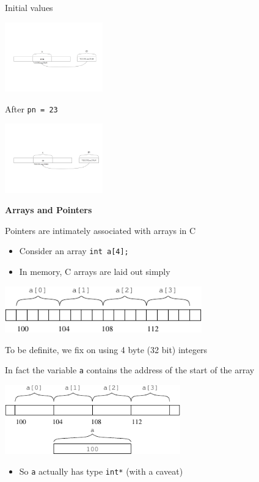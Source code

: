 \documentclass{beamer}
\def\code#1{{\ifmmode\else\large\fi\tt#1}}
\begin{document}
\begin{frame}
Initial values
\bigskip
\begin{center}
\includegraphics[height=3cm, keepaspectratio]{Pics/pointers1}
\end{center}
\end{frame}

\begin{frame}
After \code{*pn = 23}
\begin{center}
\includegraphics[height=3cm, keepaspectratio]{Pics/pointers2}
\end{center}
\end{frame}

\begin{frame}
\begin{center}
\textbf{Arrays and Pointers}
\end{center}
Pointers are intimately associated with arrays in C
\begin{itemize}
\item Consider an array \code{int a[4];}
\item In memory, C arrays are laid out simply
\end{itemize}
\begin{center}
\includegraphics[height=2cm, keepaspectratio]{Pics/ptrarray1}
\end{center}
\bigskip
To be definite, we fix on using 4 byte (32 bit) integers
\end{frame}

\begin{frame}
In fact the variable \code{a} contains the address of the start of the array
\begin{center}
\includegraphics[height=3cm, keepaspectratio]{Pics/ptrarray2}
\end{center}
\begin{itemize}
\item{So \code{a} actually has type \code{int*} (with a caveat)}
\end{itemize}
\end{frame}
\end{document}
